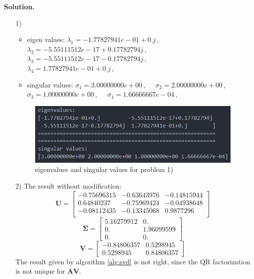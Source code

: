 \documentclass[english,onecolumn]{IEEEtran}
\begin{document}
\noindent
\textbf{Solution.}
\begin{enumerate}
    \item[1)] \begin{itemize}
        \item eigen values: $\lambda_1 = -1.77827941e-01+0.j \,, \quad$  $\lambda_2 = -5.55111512e-17+0.17782794j \,, \quad$ \\ $\lambda_3 = -5.55111512e-17-0.17782794j \,, \quad$ $\lambda_4 = 1.77827941e-01+0.j \,, \quad$
        \item singular values: $\sigma_1 = 3.00000000e+00 \,, \quad $ $\sigma_2 = 2.00000000e+00 \,, \quad $ $\sigma_3 = 1.00000000e+00 \,, \quad $ $\sigma_4 = 1.66666667e-04 \,, \quad $
    \end{itemize}
    \begin{figure}[htbp]
        \centering
        \includegraphics[width=1\textwidth]{p2_1.png}
        \caption{eigenvalues and singular values for problem 1)}
        \label{fig.p2_1}
    \end{figure}
    \item[2)] The result without modification: $$\bm{U}=\begin{bmatrix}
        -0.75696315 & -0.63643976 & -0.14815944 \\
        0.64840237 & -0.75969424 & -0.04938648 \\
        -0.08112435 & -0.13345068 & 0.9877296 \\
    \end{bmatrix}$$ $$\bm{\Sigma} = \begin{bmatrix}
        5.16279912 & 0. \\
        0. & 1.96099599\\
        0. &  0.        
    \end{bmatrix}$$ $$\bm{V} = \begin{bmatrix}
        -0.84806357 & 0.5298945 \\
        0.5298945 &  0.84806357
    \end{bmatrix}$$
    The result given by algorithm \ref{alg:svd} is not right, since the QR factorization is not unique for $\bm{AV}$.

\end{enumerate}
\end{document}
